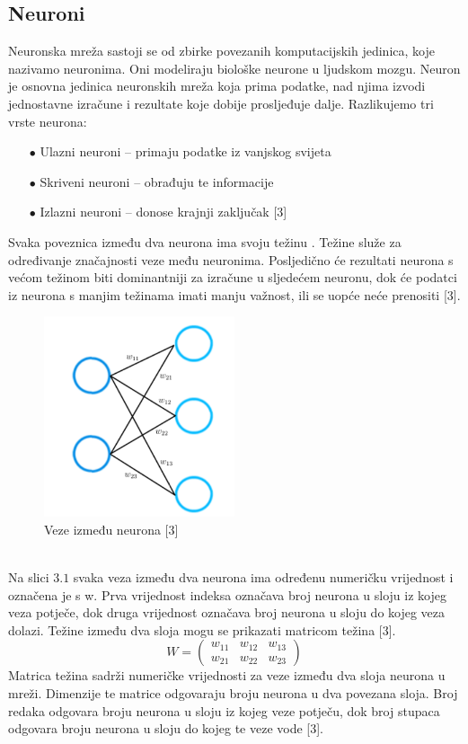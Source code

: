 \documentclass[times, utf8, zavrsni]{fer}
\begin{document}
\subsection*{Neuroni}
\indent{}
Neuronska mreža sastoji se od zbirke povezanih komputacijskih jedinica, koje nazivamo neuronima. Oni modeliraju biološke neurone u ljudskom mozgu. Neuron je osnovna jedinica neuronskih mreža koja prima podatke, nad njima izvodi jednostavne izračune i rezultate koje dobije prosljeđuje dalje. Razlikujemo tri vrste neurona:
\begin{itemize}
\item[$\bullet$] Ulazni neuroni -- primaju podatke iz vanjskog svijeta
\item[$\bullet$] Skriveni neuroni -- obrađuju te informacije
\item[$\bullet$] Izlazni neuroni -- donose krajnji zaključak [3]
\end{itemize}

\newpage
Svaka poveznica između dva neurona ima svoju težinu . Težine služe za određivanje značajnosti veze među neuronima. Posljedično će rezultati neurona s većom težinom biti dominantniji za izračune u sljedećem neuronu, dok će podatci iz neurona s manjim težinama imati manju važnost, ili se uopće neće prenositi [3].
%
\begin{figure}[!h]
\centering
\includegraphics[width=0.5\textwidth]{./slike/weights}
\caption{Veze između neurona [3]}
\label{fig:neuroni-veze}
\end{figure}
%
\\
Na slici $3.1$ svaka veza između dva neurona ima određenu numeričku vrijednost i označena je s w. Prva vrijednost indeksa označava broj neurona u sloju iz kojeg veza potječe, dok druga vrijednost označava broj neurona u sloju do kojeg veza dolazi. Težine između dva sloja mogu se prikazati matricom težina [3]. 
%
\begin{equation}
W =
\begin{pmatrix}
w_{11} & w_{12} & w_{13}\\
w_{21} & w_{22} & w_{23}
\end{pmatrix}
\end{equation}
%
Matrica težina sadrži numeričke vrijednosti za veze između dva sloja neurona u mreži. Dimenzije te matrice odgovaraju broju neurona u dva povezana sloja. Broj redaka odgovara broju neurona u sloju iz kojeg veze potječu, dok broj stupaca odgovara broju neurona u sloju do kojeg te veze vode [3]. 
\end{document}
